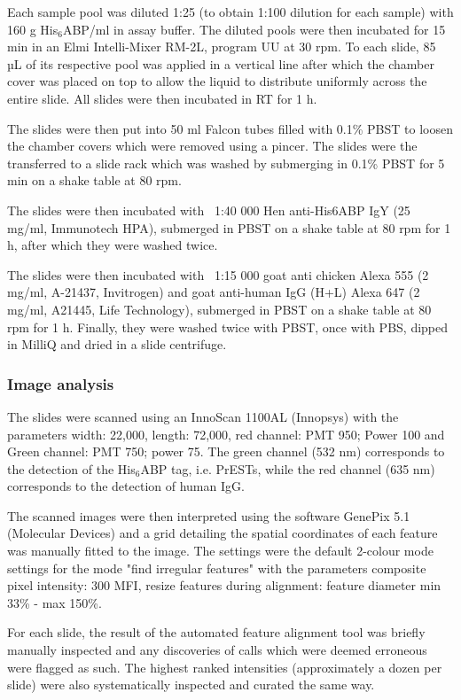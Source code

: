 \documentclass{article}
\begin{document}
Each sample pool was diluted 1:25 (to obtain 1:100 dilution for each sample) with 160 \textmu g His$_6$ABP/ml in assay buffer. The diluted pools were then incubated for 15 min in an Elmi Intelli-Mixer RM-2L, program UU at 30 rpm. To each slide, 85 µL of its respective pool was applied in a vertical line after which the chamber cover was placed on top to allow the liquid to distribute uniformly across the entire slide. All slides were then incubated in RT for 1 h.

The slides were then put into 50 ml Falcon tubes filled with 0.1\% PBST to loosen the chamber covers which were removed using a pincer. The slides were the transferred to a slide rack which was washed by submerging in 0.1\% PBST for 5 min on a shake table at 80 rpm.

The slides were then incubated with ~1:40 000 Hen anti-His6ABP IgY (25 mg/ml, Immunotech HPA), submerged in PBST on a shake table at 80 rpm for 1 h, after which they were washed twice.

The slides were then incubated with ~1:15 000 goat anti chicken Alexa 555 (2 mg/ml, A-21437, Invitrogen) and goat anti-human IgG (H+L) Alexa 647 (2 mg/ml, A21445, Life Technology), submerged in PBST on a shake table at 80 rpm for 1 h. Finally, they were washed twice with PBST, once with PBS, dipped in MilliQ and dried in a slide centrifuge.

\subsubsection{Image analysis}
The slides were scanned using an InnoScan 1100AL (Innopsys) with the parameters width: 22,000, length: 72,000, red channel: PMT 950; Power 100 and Green channel: PMT 750; power 75. The green channel (532 nm) corresponds to the detection of the His$_6$ABP tag, i.e. PrESTs, while the red channel (635 nm) corresponds to the detection of human IgG.

The scanned images were then interpreted using the software GenePix 5.1 (Molecular Devices) and a grid detailing the spatial coordinates of each feature was manually fitted to the image. The settings were the default 2-colour mode settings for the mode "find irregular features" with the parameters composite pixel intensity: 300 MFI, resize features during alignment: feature diameter min 33\% - max 150\%.

For each slide, the result of the automated feature alignment tool was briefly manually inspected and any discoveries of calls which were deemed erroneous were flagged as such. The highest ranked intensities (approximately a dozen per slide) were also systematically inspected and curated the same way.
\end{document}

